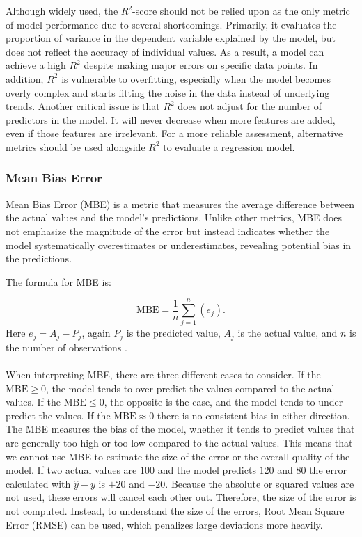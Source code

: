 \noindent Although widely used, the $R^2$-score should not be relied upon as the only metric of model performance due to several shortcomings. Primarily, it evaluates the proportion of variance in the dependent variable explained by the model, but does not reflect the accuracy of individual values. As a result, a model can achieve a high $R^2$ despite making major errors on specific data points. In addition, $R^2$ is vulnerable to overfitting, especially when the model becomes overly complex and starts fitting the noise in the data instead of underlying trends. Another critical issue is that $R^2$ does not adjust for the number of predictors in the model. It will never decrease when more features are added, even if those features are irrelevant. For a more reliable assessment, alternative metrics should be used alongside $R^2$ to evaluate a regression model. 
\newpage

\subsubsection{Mean Bias Error}
Mean Bias Error (MBE) is a metric that measures the average difference between the actual values and the model's predictions. Unlike other metrics, MBE does not emphasize the magnitude of the error but instead indicates whether the model systematically overestimates or underestimates, revealing potential bias in the predictions. \newline 

\noindent The formula for MBE is:

\begin{equation}
\text{MBE}=\frac{1}{n}\sum_{j=1}^{n}(e_{j}).
\end{equation}
\noindent Here $e_{j}=A_{j}-P_{j}$, again $P_{j}$ is the predicted value, $A_{j}$ is the actual value, and $n$ is the number of observations \cite{metrics}.
\\\\

\noindent When interpreting MBE, there are three different cases to consider. If the $\text{MBE}\geq 0$, the model tends to over-predict the values compared to the actual values. If the $\text{MBE}\leq0$, the opposite is the case, and the model tends to under-predict the values. If the $\text{MBE}\approx0$ there is no consistent bias in either direction.
\\

\noindent The MBE measures the bias of the model, whether it tends to predict values that are generally too high or too low compared to the actual values. This means that we cannot use MBE to estimate the size of the error or the overall quality of the model. If two actual values are $100$ and the model predicts $120$ and $80$ the error calculated with $\hat{y}-y$ is $+20$ and $-20$. Because the absolute or squared values are not used, these errors will cancel each other out. Therefore, the size of the error is not computed. Instead, to understand the size of the errors, Root Mean Square Error (RMSE) can be used, which penalizes large deviations more heavily.

